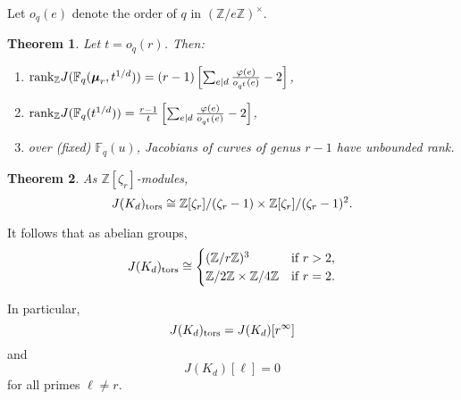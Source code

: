 \documentclass[reqno]{amsart}
\newtheorem{thm}{Theorem}[section]
\theoremstyle{definition}
\theoremstyle{remark}
\def\bmu{{\boldsymbol\mu}}
\def\Gal{\textrm{\upshape Gal}}
\def\Z{\mathbb{Z}}
\def\F{\mathbb{F}}
\def\rank{\textnormal{rank}}
\def\torsion{\textnormal{tors}}
\def\GL{\mathrm{GL}}
\begin{document}
Let $o_q(e)$ denote the order of $q$ in $(\Z/e\Z)^\times$.


\begin{thm}
\label{smallerfldthm}
Let $t=o_q(r)$. Then:
\begin{enumerate}
\item[(i)]
$\rank_\Z J(\F_q(\bmu_r,t^{1/d})) = (r-1)\left[\sum_{e\mid d}\frac{\varphi(e)}{o_{q^t}(e)}-
2 \right]$,
\item[(ii)]
$\rank_\Z J(\F_q(t^{1/d})) = {\frac{r-1}{t}}\left[\sum_{e\mid d}\frac{\varphi(e)}{o_{q^t}(e)}-
2 \right]$,
\item[(iii)]
over (fixed) $\F_q(u)$, Jacobians of curves of genus $r-1$ have unbounded rank.
\end{enumerate}
\end{thm}


\begin{thm}
\label{torsionthm}
As $\Z[\zeta_r]$-modules,
\[
J(K_d)_{\textup{tors}} \cong \Z[\zeta_r]/(\zeta_r-1) \times \Z[\zeta_r]/(\zeta_r-1)^2.
\]
\end{thm}

It follows that as abelian groups,
$$
J(K_d)_{\torsion} \cong 
\begin{cases}
(\Z/r\Z)^3 & \text{if $r>2$}, \\
\Z/2\Z \times \Z/4\Z & \text{if $r=2$}.
\end{cases}
$$

In particular,
$$
J(K_d)_{\torsion} =J(K_d)[r^\infty]
$$
and
$$
J(K_d)[\ell] = 0
$$
for all primes $\ell \neq r$.

%
%
%
%
%
%
%
\end{document}
